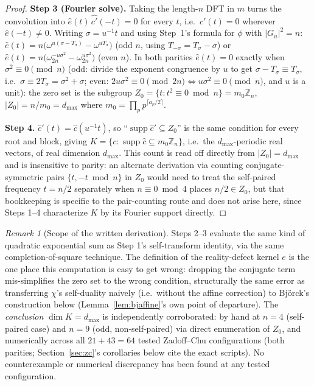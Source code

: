 \documentclass[11pt]{article}
\theoremstyle{plain}
\theoremstyle{definition}
\theoremstyle{remark}
\newtheorem{remark}[theorem]{Remark}
\newcommand{\Z}{\mathbb Z}
\begin{document}
\begin{proof}
\textbf{Step 3 (Fourier solve).} Taking the length-$n$ DFT in $m$ turns the
convolution into $\hat e(t)\,\widehat{c'}(-t)=0$ for every $t$, i.e.\
$\hat c'(t)=0$ wherever $\hat e(-t)\ne0$. Writing $\sigma=u^{-1}t$ and using
Step~1's formula for $\phi$ with $|G_u|^2=n$:
$\hat e(t)=n\bigl(\omega^{u(\sigma-T_\sigma)}-\omega^{uT_\sigma}\bigr)$
(odd $n$, using $T_{-\sigma}=T_\sigma-\sigma$) or
$\hat e(t)=n\bigl(\omega_{2n}^{-u\sigma^2}-\omega_{2n}^{u\sigma^2}\bigr)$
(even $n$). In both parities $\hat e(t)=0$ exactly when
$\sigma^2\equiv0\pmod n$ (odd: divide the exponent congruence by $u$ to get
$\sigma-T_\sigma\equiv T_\sigma$, i.e.\ $\sigma\equiv2T_\sigma=\sigma^2+\sigma$;
even: $2u\sigma^2\equiv0\pmod{2n}\iff u\sigma^2\equiv0\pmod n$, and $u$ is a
unit): the zero set is the subgroup $Z_0=\{t: t^2\equiv0\bmod n\}=m_0\Z_n$,
$|Z_0|=n/m_0=d_{\max}$ where $m_0=\prod_pp^{\lceil a_p/2\rceil}$.

\textbf{Step 4.} $\hat c'(t)=\hat c(u^{-1}t)$, so ``$\operatorname{supp}\hat c'\subseteq Z_0$''
is the same condition for every root and block, giving
$K=\{c:\operatorname{supp}\hat c\subseteq m_0\Z_n\}$, i.e.\ the
$d_{\max}$-periodic real vectors, of real dimension $d_{\max}$. This count
is read off directly from $|Z_0|=d_{\max}$ and is insensitive to parity:
an alternate derivation via counting conjugate-symmetric pairs
$\{t,-t\bmod n\}$ in $Z_0$ would need to treat the self-paired frequency
$t=n/2$ separately when $n\equiv0\bmod4$ places $n/2\in Z_0$, but that
bookkeeping is specific to the pair-counting route and does not arise
here, since Steps 1--4 characterize $K$ by its Fourier support directly.
\end{proof}

\begin{remark}[Scope of the written derivation]
Steps 2--3 evaluate the same kind of quadratic exponential sum as Step
1's self-transform identity, via the same completion-of-square technique.
The definition of the reality-defect kernel $e$ is the one place this
computation is easy to get wrong: dropping the conjugate term mis-simplifies
the zero set to the wrong condition, structurally the same error as
transferring $\chi$'s self-duality naively (i.e.\ without the affine
correction) to Bj\"orck's construction below (Lemma~\ref{lem:bjaffine}'s
own point of departure). The \emph{conclusion}
$\dim K=d_{\max}$ is independently corroborated: by hand at $n=4$
(self-paired case) and $n=9$ (odd, non-self-paired) via direct enumeration
of $Z_0$, and numerically across all $21+43=64$ tested Zadoff--Chu
configurations (both parities; Section~\ref{sec:zc}'s corollaries below
cite the exact scripts). No counterexample or numerical discrepancy has
been found at any tested configuration.
\end{remark}
\end{document}
